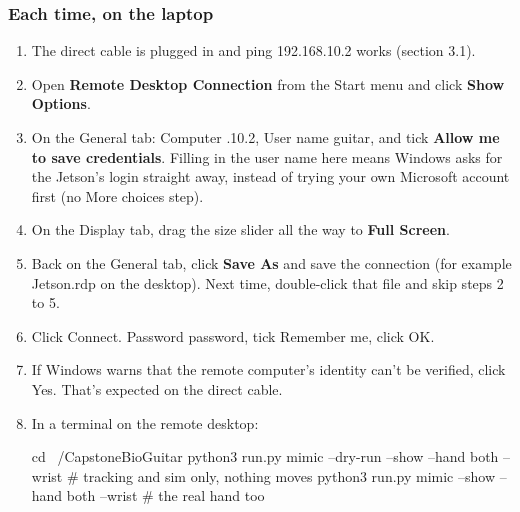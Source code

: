 \documentclass[11pt,letterpaper]{article}
\newcommand{\code}[1]{\textcolor{codeblue}{\ttfamily\smaller\relax #1}}
\begin{document}
\subsubsection*{Each time, on the laptop}
\begin{enumerate}
  \item The direct cable is plugged in and \code{ping 192.168.10.2} works (section 3.1).
  \item Open \textbf{Remote Desktop Connection} from the Start menu and click \textbf{Show Options}.
  \item On the General tab: Computer \code{192.168.10.2}, User name \code{guitar}, and tick \textbf{Allow me to save credentials}. Filling in the user name here means Windows asks for the Jetson's login straight away, instead of trying your own Microsoft account first (no More choices step).
  \item On the Display tab, drag the size slider all the way to \textbf{Full Screen}.
  \item Back on the General tab, click \textbf{Save As} and save the connection (for example \code{Jetson.rdp} on the desktop). Next time, double-click that file and skip steps 2 to 5.
  \item Click Connect. Password \code{password}, tick Remember me, click OK.
  \item If Windows warns that the remote computer's identity can't be verified, click Yes. That's expected on the direct cable.
  \item In a terminal on the remote desktop:
\begin{codeblock}
cd ~/CapstoneBioGuitar
python3 run.py mimic --dry-run --show --hand both --wrist   # tracking and sim only, nothing moves
python3 run.py mimic --show --hand both --wrist             # the real hand too
\end{codeblock}
\end{enumerate}
\end{document}
